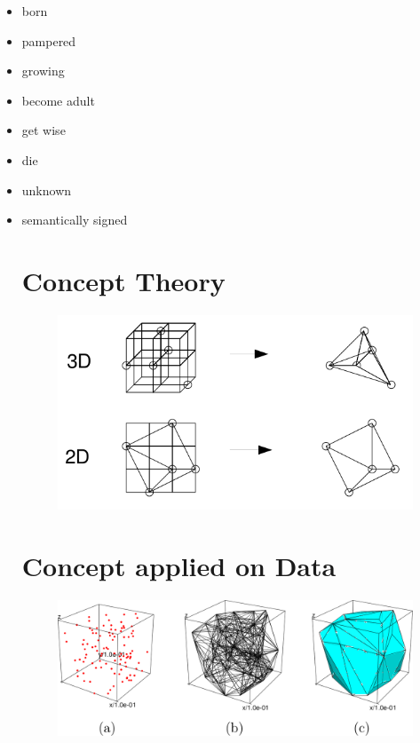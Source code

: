 \documentclass[11pt]{article}
\begin{document}
\begin{itemize} 
\label{item any mix of states}
\item born \item pampered  \item growing 
\item become adult \item get wise \item die
\item unknown
\item semantically signed



\section{Concept Theory}
\begin{figure}[htp]
\includegraphics[scale=0.55]{image/research-base-002.png}
\end{figure}


\section{Concept applied on Data}
\begin{figure}[htp]
\includegraphics[scale=0.2]{image/research-base-001.png}
\end{figure}




\end{itemize}
\end{document}
